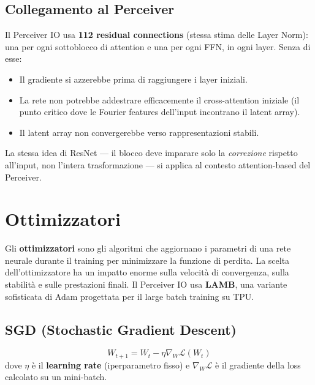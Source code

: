 \documentclass[
  11pt,
]{article}
\begin{document}
\subsection{Collegamento al Perceiver}

\begin{notabox}[title={\textbf{Residual connections nel Perceiver IO}}]
Il Perceiver IO usa \textbf{112 residual connections} (stessa stima delle Layer Norm): una per ogni sottoblocco di attention e una per ogni FFN, in ogni layer. Senza di esse:
\begin{itemize}
  \item Il gradiente si azzerebbe prima di raggiungere i layer iniziali.
  \item La rete non potrebbe addestrare efficacemente il cross-attention iniziale (il punto critico dove le Fourier features dell'input incontrano il latent array).
  \item Il latent array non convergerebbe verso rappresentazioni stabili.
\end{itemize}
La stessa idea di ResNet --- il blocco deve imparare solo la \emph{correzione} rispetto all'input, non l'intera trasformazione --- si applica al contesto attention-based del Perceiver.
\end{notabox}

\section{Ottimizzatori}
\label{app:optimizers}

Gli \textbf{ottimizzatori} sono gli algoritmi che aggiornano i parametri di una rete neurale durante il training per minimizzare la funzione di perdita. La scelta dell'ottimizzatore ha un impatto enorme sulla velocità di convergenza, sulla stabilità e sulle prestazioni finali. Il Perceiver IO usa \textbf{LAMB}, una variante sofisticata di Adam progettata per il large batch training su TPU.

\subsection{SGD (Stochastic Gradient Descent)}

\begin{formulabox}[title={\textbf{SGD --- Aggiornamento dei pesi}}]
\[
W_{t+1} = W_t - \eta \nabla_W \mathcal{L}(W_t)
\]
dove $\eta$ è il \textbf{learning rate} (iperparametro fisso) e $\nabla_W \mathcal{L}$ è il gradiente della loss calcolato su un mini-batch.
\end{formulabox}
\end{document}
